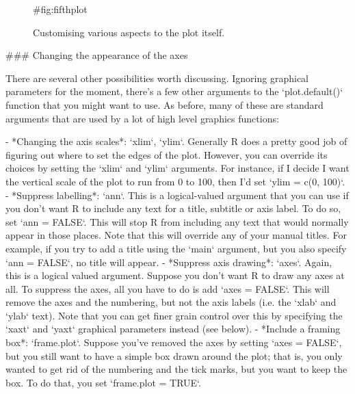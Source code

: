 \begin{figure}[t]
\begin{center}
\caption{Customising various aspects to the plot itself.}
\HR
{#fig:fifthplot}
\end{center}
\end{figure}



### Changing the appearance of the axes


There are several other possibilities worth discussing. Ignoring graphical parameters for the moment, there's a few other arguments to the `plot.default()` function that you might want to use. As before,  many of these are standard arguments that are used by a lot of high level graphics functions:
 
- *Changing the axis scales*: `xlim`, `ylim`. Generally R does a pretty good job of figuring out where to set the edges of the plot. However, you can override its choices by setting the `xlim` and `ylim` arguments. For instance, if I decide I want the vertical scale of the plot to run from 0 to 100, then I'd set `ylim = c(0, 100)`. 
- *Suppress labelling*: `ann`. This is a logical-valued argument that you can use if you don't want R to include any text for a title, subtitle or axis label. To do so, set `ann = FALSE`. This will stop R from including any text that would normally appear in those places. Note that this will override any of your manual titles. For example, if you try to add a title using the `main` argument, but you also specify `ann = FALSE`, no title will appear.
- *Suppress axis drawing*: `axes`. Again, this is a logical valued argument. Suppose you don't want R to draw any axes at all. To suppress the axes, all you have to do is add `axes = FALSE`. This will remove the axes and the numbering, but not the axis labels (i.e. the `xlab` and `ylab` text). Note that you can get finer grain control over this by specifying the `xaxt` and `yaxt` graphical parameters instead (see below).
- *Include a framing box*: `frame.plot`. Suppose you've removed the axes by setting `axes = FALSE`, but you still want to have a simple box drawn around the plot; that is, you only wanted to get rid of the numbering and the tick marks, but you want to keep the box. To do that, you set `frame.plot = TRUE`. 

